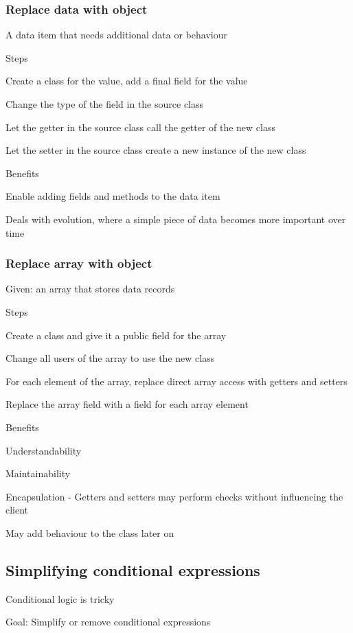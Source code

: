 \subsubsection{Replace data with object}
\enumstart
	\item A data item that needs additional data or behaviour
	\item Steps
	\enumstart
		\item Create a class for the value, add a final field for the value
		\item Change the type of the field in the source class
		\item Let the getter in the source class call the getter of the new class
		\item Let the setter in the source class create a new instance of the new class
	\enumend
	\item Benefits
	\enumstart
		\item Enable adding fields and methods to the data item
		\item Deals with evolution, where a simple piece of data becomes more important over time
	\enumend
\enumend

\subsubsection{Replace array with object}
\enumstart
	\item Given: an array that stores data records
	\item Steps
	\enumstart
		\item Create a class and give it a public field for the array
		\item Change all users of the array to use the new class
		\item For each element of the array, replace direct array access with getters and setters
		\item Replace the array field with a field for each array element
	\enumend
	\item Benefits
	\enumstart
		\item Understandability
		\item Maintainability
		\item Encapsulation - Getters and setters may perform checks without influencing the client
		\item May add behaviour to the class later on
	\enumend
\enumend

\subsection{Simplifying conditional expressions}
\enumstart
	\item Conditional logic is tricky
	\item Goal: Simplify or remove conditional expressions
\enumend

